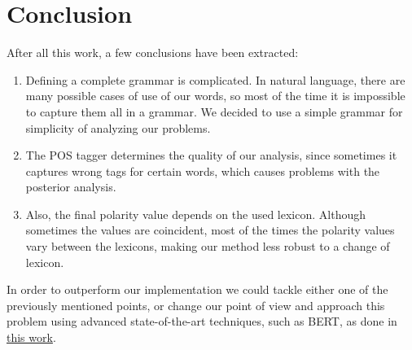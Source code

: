 \documentclass[11pt]{article}
\begin{document}
\section{ Conclusion}

After all this work, a few conclusions have been extracted:
\begin{enumerate}
    \item Defining a complete grammar is complicated. In natural language, there are many possible cases of use of our words, so most of the time it is impossible to capture them all in a grammar. We decided to use a simple grammar for simplicity of analyzing our problems.
    \item The POS tagger determines the quality of our analysis, since sometimes it captures wrong tags for certain words, which causes problems with the posterior analysis.
    \item Also, the final polarity value depends on the used lexicon. Although sometimes the values are coincident, most of the times the polarity values vary between the lexicons, making our method less robust to a change of lexicon.
\end{enumerate}

In order to outperform our implementation we could tackle either one of the previously mentioned points, or change our point of view and approach this problem using advanced state-of-the-art techniques, such as BERT, as done in \href{https://arxiv.org/abs/2010.11731}{this work}.
\end{document}
